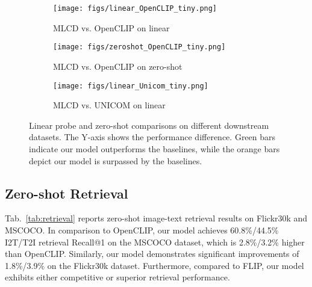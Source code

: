 \begin{figure}[t!]
\centering
\begin{subfigure}[b]{0.328\textwidth}
  \centering
  \texttt{[image: figs/linear\_OpenCLIP\_tiny.png]}
  \captionsetup{font=tiny} 
  \caption{MLCD vs. OpenCLIP on linear}
  \label{fig:openclip_linear}
\end{subfigure}
\hfill
\begin{subfigure}[b]{0.328\textwidth}
  \centering
  \texttt{[image: figs/zeroshot\_OpenCLIP\_tiny.png]}
  \captionsetup{font=tiny} 
  \caption{MLCD vs. OpenCLIP on zero-shot}
  \label{fig:openclip_zeroshot}
\end{subfigure}
\hfill
\begin{subfigure}[b]{0.328\textwidth}
  \centering
  \texttt{[image: figs/linear\_Unicom\_tiny.png]}
  \captionsetup{font=tiny} 
  \caption{MLCD vs. UNICOM on linear}
  \label{fig:unicom_linear}
\end{subfigure}
\caption{Linear probe and zero-shot comparisons on different downstream datasets. The Y-axis shows the performance difference. Green bars indicate our model outperforms the baselines, while the orange bars depict our model is surpassed by the baselines.}
\label{fig:fig_histogram}
\vspace{-4mm}
\end{figure}

\subsection{Zero-shot Retrieval}

Tab.~\ref{tab:retrieval} reports zero-shot image-text retrieval results on Flickr30k and MSCOCO. In comparison to OpenCLIP, our model achieves 60.8\%/44.5\% I2T/T2I retrieval Recall@1 on the MSCOCO dataset, which is 2.8\%/3.2\% higher than OpenCLIP. Similarly, our model demonstrates significant improvements of 1.8\%/3.9\% on the Flickr30k dataset. Furthermore, compared to FLIP, our model exhibits either competitive or superior retrieval performance.

